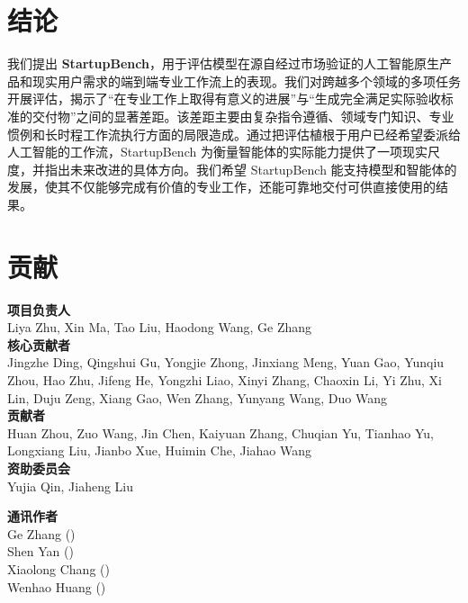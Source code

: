 \onecolumn
\noindent\begin{minipage}[t]{0.48\textwidth}
\section{结论}
我们提出 \textbf{StartupBench}，用于评估模型在源自经过市场验证的人工智能原生产品和现实用户需求的端到端专业工作流上的表现。我们对跨越多个领域的多项任务开展评估，揭示了“在专业工作上取得有意义的进展”与“生成完全满足实际验收标准的交付物”之间的显著差距。该差距主要由复杂指令遵循、领域专门知识、专业惯例和长时程工作流执行方面的局限造成。通过把评估植根于用户已经希望委派给人工智能的工作流，StartupBench 为衡量智能体的实际能力提供了一项现实尺度，并指出未来改进的具体方向。我们希望 StartupBench 能支持模型和智能体的发展，使其不仅能够完成有价值的专业工作，还能可靠地交付可供直接使用的结果。

\end{minipage}\hfill
\begin{minipage}[t]{0.48\textwidth}
\section{贡献}

\textbf{项目负责人} \\
Liya Zhu, Xin Ma, Tao Liu, Haodong Wang, Ge Zhang \\

\vspace{0.5em}
\textbf{核心贡献者} \\
Jingzhe Ding, Qingshui Gu, Yongjie Zhong, Jinxiang Meng, Yuan Gao,
Yunqiu Zhou, Hao Zhu, Jifeng He,
Yongzhi Liao, Xinyi Zhang, Chaoxin Li, Yi Zhu,
Xi Lin, Duju Zeng, Xiang Gao, Wen Zhang,
Yunyang Wang, Duo Wang \\

\vspace{0.5em}
\textbf{贡献者} \\
Huan Zhou, Zuo Wang, Jin Chen, Kaiyuan Zhang, Chuqian Yu, Tianhao Yu, Longxiang Liu, Jianbo Xue, Huimin Che, Jiahao Wang \\

\vspace{0.5em}
\textbf{资助委员会} \\
Yujia Qin, Jiaheng Liu

\vspace{0.5em}
\textbf{通讯作者} \\
Ge Zhang ()\\
Shen Yan () \\
Xiaolong Chang ()\\
Wenhao Huang ()\\
\end{minipage}
\twocolumn
